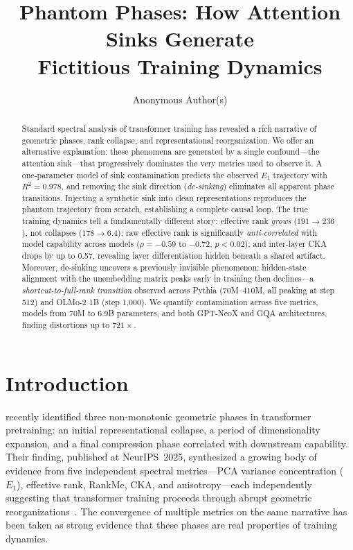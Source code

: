 \documentclass[11pt]{article}
\title{Phantom Phases: How Attention Sinks Generate\\Fictitious Training Dynamics}
\author{Anonymous Author(s)}
\date{}
\begin{document}
\maketitle

\begin{abstract}
Standard spectral analysis of transformer training has revealed a rich narrative of geometric phases, rank collapse, and representational reorganization.
We offer an alternative explanation: these phenomena are generated by a single confound---the attention sink---that progressively dominates the very metrics used to observe it.
A one-parameter model of sink contamination predicts the observed $E_1$ trajectory with $R^2 = 0.978$, and removing the sink direction (\emph{de-sinking}) eliminates all apparent phase transitions.
Injecting a synthetic sink into clean representations reproduces the phantom trajectory from scratch, establishing a complete causal loop.
The true training dynamics tell a fundamentally different story: effective rank \emph{grows} ($191 \to 236$), not collapses ($178 \to 6.4$); raw effective rank is significantly \emph{anti-correlated} with model capability across models ($\rho = -0.59$ to $-0.72$, $p < 0.02$); and inter-layer CKA drops by up to 0.57, revealing layer differentiation hidden beneath a shared artifact.
Moreover, de-sinking uncovers a previously invisible phenomenon: hidden-state alignment with the unembedding matrix peaks early in training then declines---a \emph{shortcut-to-full-rank transition} observed across Pythia (70M--410M, all peaking at step 512) and OLMo-2 1B (step 1{,}000).
We quantify contamination across five metrics, models from 70M to 6.9B parameters, and both GPT-NeoX and GQA architectures, finding distortions up to $721\times$.
\end{abstract}

\section{Introduction}\label{sec:intro}

\citet{li2025tracing} recently identified three non-monotonic geometric phases in transformer pretraining: an initial representational collapse, a period of dimensionality expansion, and a final compression phase correlated with downstream capability.
Their finding, published at NeurIPS~2025, synthesized a growing body of evidence from five independent spectral metrics---PCA variance concentration ($E_1$), effective rank, RankMe, CKA, and anisotropy---each independently suggesting that transformer training proceeds through abrupt geometric reorganizations~\citep{garrido2023rankme,ethayarajh2019contextual,raghu2021vision,timkey2021all}.
The convergence of multiple metrics on the same narrative has been taken as strong evidence that these phases are real properties of training dynamics.
\end{document}
